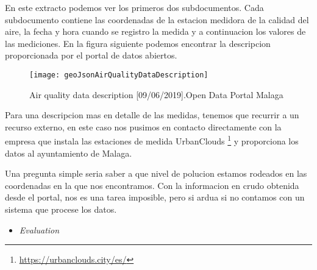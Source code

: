 En este extracto podemos ver los primeros dos subdocumentos. Cada subdocumento contiene las coordenadas de la estacion medidora de la calidad
del aire, la fecha y hora cuando se registro la medida y a continuacion los valores de las mediciones. 
En la figura siguiente podemos encontrar la descripcion proporcionada por el portal de datos abiertos.
\begin{figure}[ht]
    \centering
    \texttt{[image: geoJsonAirQualityDataDescription]}
    \caption{Air quality data description [09/06/2019].Open Data Portal Malaga}
\end{figure}

Para una descripcion mas en detalle de las medidas, tenemos que recurrir a un recurso externo, en este caso nos pusimos en contacto directamente con
la empresa que instala las estaciones de medida UrbanClouds \footnote{\url{https://urbanclouds.city/es/}} y proporciona los datos al ayuntamiento de Malaga.

Una pregunta simple seria saber a que nivel de polucion estamos rodeados en las coordenadas en la que nos encontramos. Con la informacion en 
crudo obtenida desde el portal, nos es una tarea imposible, pero si ardua si no contamos con un sistema que procese los datos.
\begin{itemize}
    \item \textit{Evaluation}
\end{itemize}
